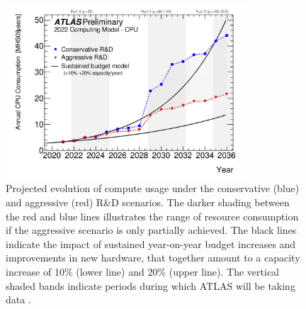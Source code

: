 \begin{figure}[!htbp]
  \centering
  \includegraphics[width=0.8\textwidth]{images/2-LHC-ATLAS/computing-model.png}
  \caption{
    Projected evolution of compute usage under the conservative (blue) and aggressive (red) R\&D scenarios. The darker shading between the red and blue lines illustrates the range of resource consumption if the aggressive scenario is only partially achieved. The black lines indicate the impact of sustained year-on-year budget increases and improvements in new hardware, that together amount to a capacity increase of 10\% (lower line) and 20\% (upper line). The vertical shaded bands indicate periods during which ATLAS will be taking data \cite{Collaboration:2802918}.
  }
  \label{fig:pileup-walltime}
\end{figure}


